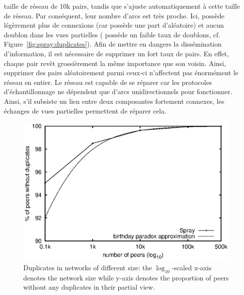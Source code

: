 \begin{asparadesc}
  taille de réseau de 10k pairs, tandis que \SPRAY s'ajuste automatiquement à
  cette taille de réseau. Par conséquent, leur nombre d'arcs est très
  proche. Ici, \CYCLON possède légèrement plus de connexions (car \SPRAY possède
  une part d'aléatoire) et aucun doublon dans les vues partielles (\SPRAY
  possède un faible taux de doublons,
  cf. Figure~\ref{fig:spray:duplicates}). Afin de mettre en dangers la
  dissémination d'information, il est nécessaire de supprimer un fort taux de
  pairs. En effet, chaque pair revêt grossièrement la même importance que son
  voisin. Ainsi, supprimer des pairs aléatoirement parmi ceux-ci n'affectent pas
  énormément le réseau en entier. Le réseau est capable de se réparer car les
  protocoles d'échantillonnage ne dépendent que d'arcs unidirectionnels pour
  fonctionner. Ainsi, s'il subsiste un lien entre deux composantes fortement
  connexes, les échanges de vues partielles permettent de réparer cela.
\end{asparadesc}


\begin{figure}
  \centering
  \includegraphics[width=.8\textwidth]{img/spray/duplicates.eps}
  \caption{\label{fig:duplicates}Duplicates in networks of different size: the
    $\log_{10}$-scaled x-axis denotes the network size while y-axis denotes the
    proportion of peers without any duplicates in their partial view.}
\end{figure}

